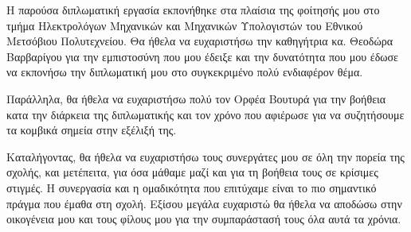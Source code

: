 \begin{acknowledgementsgr}Η παρούσα διπλωματική εργασία εκπονήθηκε στα πλαίσια της φοίτησής μου στο
τμήμα  Ηλεκτρολόγων Μηχανικών και Μηχανικών Υπολογιστών του Εθνικού Μετσόβιου
Πολυτεχνείου. Θα ήθελα να ευχαριστήσω την καθηγήτρια κα. Θεοδώρα Βαρβαρίγου για την εμπιστοσύνη που μου έδειξε και την δυνατότητα που μου έδωσε
να εκπονήσω την διπλωματική μου στο συγκεκριμένο πολύ ενδιαφέρον θέμα.  

Παράλληλα, θα ήθελα να ευχαριστήσω πολύ τον Ορφέα Βουτυρά για την βοήθεια κατα την διάρκεια της διπλωματικής και τον χρόνο που αφιέρωσε για να συζητήσουμε τα κομβικά σημεία στην εξέλιξή της.

Καταλήγοντας, θα ήθελα να ευχαριστήσω τους συνεργάτες μου σε όλη την πορεία
της σχολής, και μετέπειτα, για όσα μάθαμε μαζί και για τη βοήθεια τους σε κρίσιμες
στιγμές. Η συνεργασία και η ομαδικότητα που επιτύχαμε είναι το πιο σημαντικό πράγμα
που έμαθα στη σχολή. Εξίσου μεγάλα ευχαριστώ θα ήθελα να αποδώσω στην οικογένεια
μου και τους φίλους μου για την συμπαράστασή τους όλα αυτά τα χρόνια.
\end{acknowledgementsgr}
